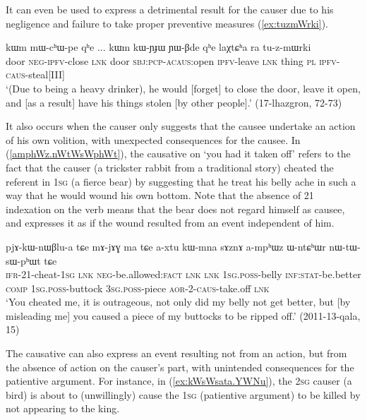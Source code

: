 It can even be used to express a detrimental result for the causer due to his negligence and failure to take proper preventive measures (\ref{ex:tuzmWrki}).

\begin{exe}
	\ex \label{ex:tuzmWrki}
	\gll kɯm mɯ-cʰɯ-pe qʰe ... kɯm kɯ-ɲɟɯ ɲɯ-βde qʰe laχtɕʰa ra tu-z-mɯrki \\
	door \textsc{neg}-\textsc{ipfv}-close \textsc{lnk} {  } door \textsc{sbj}:\textsc{pcp}-\textsc{acaus}:open \textsc{ipfv}-leave \textsc{lnk} thing \textsc{pl} \textsc{ipfv}-\textsc{caus}-steal[III] \\
	\glt  `(Due to being a heavy drinker), he would [forget] to close the door, leave it open, and [as a result] have his things stolen [by other people].' (17-lhazgron, 72-73)
\end{exe}

It also occurs when the causer only suggests that the causee undertake an action of his own volition, with unexpected consequences for the causee. In (\ref{amphWz.nWtWsWphWt}), the causative on  `you had it taken off' refers to the fact that the causer (a trickster rabbit from a traditional story) cheated the referent in \textsc{1sg} (a fierce bear) by suggesting that he treat his belly ache in such a way that he would wound his own bottom. Note that the absence of 2\fl{}1 indexation on the verb  means that the bear does not regard himself as causee, and expresses it as if the wound resulted from an event independent of him.

\begin{exe}
\ex \label{amphWz.nWtWsWphWt} 
\gll pjɤ-kɯ-nɯβlu-a tɕe mɤ-jɤɣ ma tɕe a-xtu kɯ-mna sɤznɤ a-mpʰɯz ɯ-ntɕʰɯr nɯ-tɯ-sɯ-pʰɯt tɕe \\
\textsc{ifr}-2\fl{}1-cheat-\textsc{1sg} \textsc{lnk} \textsc{neg}-be.allowed:\textsc{fact} \textsc{lnk} \textsc{lnk} \textsc{1sg}.\textsc{poss}-belly \textsc{inf}:\textsc{stat}-be.better \textsc{comp} \textsc{1sg}.\textsc{poss}-buttock \textsc{3sg}.\textsc{poss}-piece \textsc{aor}-2-\textsc{caus}-take.off \textsc{lnk} \\
\glt `You cheated me, it is outrageous, not only did my belly not get better, but [by misleading me] you caused a piece of my buttocks to be ripped off.' (2011-13-qala, 15)
\end{exe}

The causative can also express an event resulting not from an action, but from the absence of action on the causer's part, with unintended consequences for the patientive argument. For instance, in (\ref{ex:kWsWsata.YWNu}), the \textsc{2sg} causer (a bird) is about to (unwillingly) cause the \textsc{1sg} (patientive argument) to be killed by not appearing to the king. 

